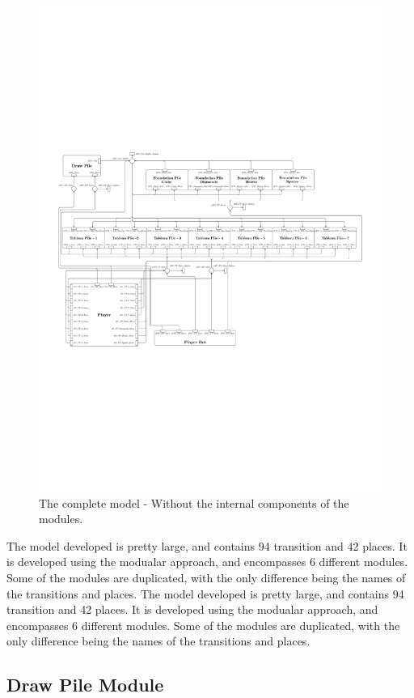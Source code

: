 \documentclass[runningheads,a4paper]{llncs}
\begin{document}
\begin{figure}
	\includegraphics[trim=40 100 100 310,angle=90,scale=1.4]{images/overallViewPdf}
	\caption{The complete model - Without the internal components of the modules.}
\end{figure}
The model developed is pretty large, and contains 94 transition and 42 places. It is developed using the modualar approach, and encompasses 6 different modules. Some of the modules are duplicated, with the only difference being the names of the transitions and places.
\newline
The model developed is pretty large, and contains 94 transition and 42 places. It is developed using the modualar approach, and encompasses 6 different modules. Some of the modules are duplicated, with the only difference being the names of the transitions and places.
\subsection{Draw Pile Module}
\end{document}
